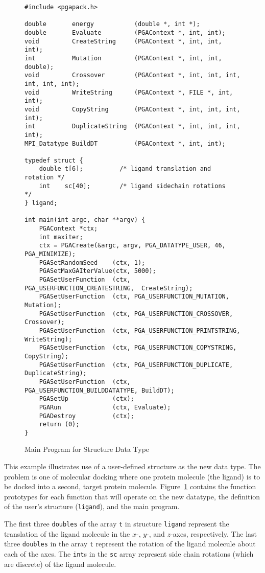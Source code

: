 \documentclass{report}
\begin{document}
\begin{figure}
\begin{verbatim}
#include <pgapack.h>

double       energy           (double *, int *);
double       Evaluate         (PGAContext *, int, int);
void         CreateString     (PGAContext *, int, int, int);
int          Mutation         (PGAContext *, int, int, double);
void         Crossover        (PGAContext *, int, int, int, int, int, int);
void         WriteString      (PGAContext *, FILE *, int, int);
void         CopyString       (PGAContext *, int, int, int, int);
int          DuplicateString  (PGAContext *, int, int, int, int);
MPI_Datatype BuildDT          (PGAContext *, int, int);

typedef struct {
    double t[6];          /* ligand translation and rotation */
    int    sc[40];        /* ligand sidechain rotations      */
} ligand;

int main(int argc, char **argv) {
    PGAContext *ctx;
    int maxiter;
    ctx = PGACreate(&argc, argv, PGA_DATATYPE_USER, 46, PGA_MINIMIZE);
    PGASetRandomSeed    (ctx, 1);
    PGASetMaxGAIterValue(ctx, 5000);
    PGASetUserFunction  (ctx, PGA_USERFUNCTION_CREATESTRING,  CreateString);
    PGASetUserFunction  (ctx, PGA_USERFUNCTION_MUTATION,      Mutation);
    PGASetUserFunction  (ctx, PGA_USERFUNCTION_CROSSOVER,     Crossover);
    PGASetUserFunction  (ctx, PGA_USERFUNCTION_PRINTSTRING,   WriteString);
    PGASetUserFunction  (ctx, PGA_USERFUNCTION_COPYSTRING,    CopyString);
    PGASetUserFunction  (ctx, PGA_USERFUNCTION_DUPLICATE,     DuplicateString);
    PGASetUserFunction  (ctx, PGA_USERFUNCTION_BUILDDATATYPE, BuildDT);
    PGASetUp            (ctx);
    PGARun              (ctx, Evaluate);
    PGADestroy          (ctx);
    return (0);
}
\end{verbatim}
\caption{Main Program for Structure Data Type}
\label{example1:new-datatype-main}
\end{figure}

This example illustrates use of a user-defined structure as the new data type.
The problem is one of molecular docking where one protein molecule (the
ligand) is to be docked into a second, target protein molecule.
Figure~\ref{example1:new-datatype-main} contains the function prototypes for
each function that will operate on the new datatype, the definition of the
user's structure ({\tt ligand}), and the main program.

The first three {\tt doubles} of the array {\tt t} in structure {\tt ligand}
represent the translation of the ligand molecule in the $x$-, $y$-, and
$z$-axes, respectively.  The last three {\tt doubles} in the array {\tt t}
represent the rotation of the ligand molecule about each of the axes.  The
{\tt int}s in the {\tt sc} array represent side chain rotations (which are
discrete) of the ligand molecule.
\end{document}
